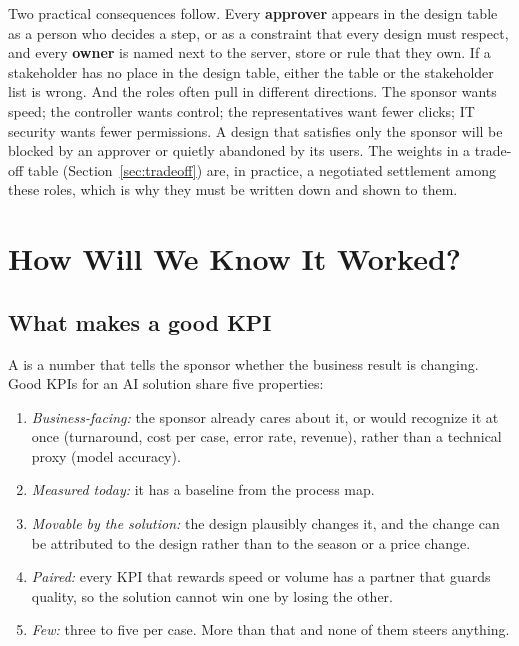 Two practical consequences follow. Every \textbf{approver} appears in the design table as a person who decides a step, or as a constraint that every design must respect, and every \textbf{owner} is named next to the server, store or rule that they own. If a stakeholder has no place in the design table, either the table or the stakeholder list is wrong. And the roles often pull in different directions. The sponsor wants speed; the controller wants control; the representatives want fewer clicks; IT security wants fewer permissions. A design that satisfies only the sponsor will be blocked by an approver or quietly abandoned by its users. The weights in a trade-off table (Section~\ref{sec:tradeoff}) are, in practice, a negotiated settlement among these roles, which is why they must be written down and shown to them.

\section{How Will We Know It Worked?}
\label{sec:kpis}

\subsection{What makes a good KPI}

A  is a number that tells the sponsor whether the business result is changing. Good KPIs for an AI solution share five properties:
\begin{enumerate}[itemsep=1pt]
  \item \emph{Business-facing:} the sponsor already cares about it, or would recognize it at once (turnaround, cost per case, error rate, revenue), rather than a technical proxy (model accuracy).
  \item \emph{Measured today:} it has a baseline from the process map.
  \item \emph{Movable by the solution:} the design plausibly changes it, and the change can be attributed to the design rather than to the season or a price change.
  \item \emph{Paired:} every KPI that rewards speed or volume has a partner that guards quality, so the solution cannot win one by losing the other.
  \item \emph{Few:} three to five per case. More than that and none of them steers anything.
\end{enumerate}


